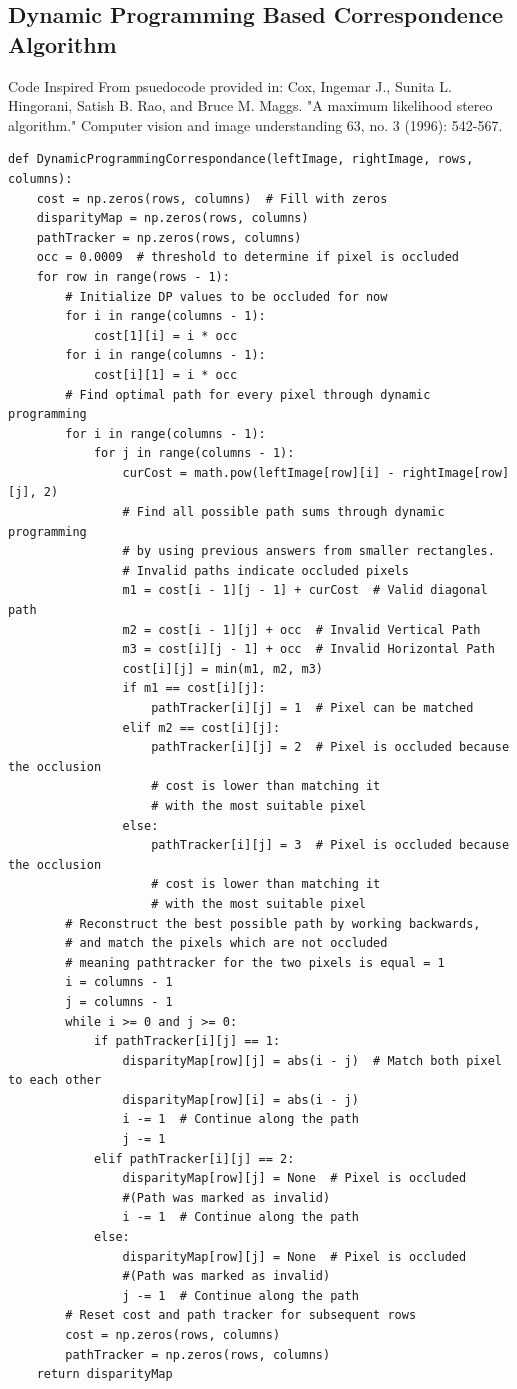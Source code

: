 \documentclass[11pt]{scrartcl}
\begin{document}
\subsection{Dynamic Programming Based Correspondence Algorithm}
Code Inspired From psuedocode provided in: Cox, Ingemar J., Sunita L. Hingorani, Satish B. Rao, and Bruce M. Maggs. 
"A maximum likelihood stereo algorithm." Computer vision and image understanding 63, 
no. 3 (1996): 542-567.
\begin{verbatim}
def DynamicProgrammingCorrespondance(leftImage, rightImage, rows, columns):
    cost = np.zeros(rows, columns)  # Fill with zeros
    disparityMap = np.zeros(rows, columns)
    pathTracker = np.zeros(rows, columns)
    occ = 0.0009  # threshold to determine if pixel is occluded
    for row in range(rows - 1):
        # Initialize DP values to be occluded for now
        for i in range(columns - 1):
            cost[1][i] = i * occ
        for i in range(columns - 1):
            cost[i][1] = i * occ
        # Find optimal path for every pixel through dynamic programming
        for i in range(columns - 1):
            for j in range(columns - 1):
                curCost = math.pow(leftImage[row][i] - rightImage[row][j], 2)
                # Find all possible path sums through dynamic programming
                # by using previous answers from smaller rectangles.
                # Invalid paths indicate occluded pixels
                m1 = cost[i - 1][j - 1] + curCost  # Valid diagonal path
                m2 = cost[i - 1][j] + occ  # Invalid Vertical Path
                m3 = cost[i][j - 1] + occ  # Invalid Horizontal Path
                cost[i][j] = min(m1, m2, m3)
                if m1 == cost[i][j]:
                    pathTracker[i][j] = 1  # Pixel can be matched
                elif m2 == cost[i][j]:
                    pathTracker[i][j] = 2  # Pixel is occluded because the occlusion  
                    # cost is lower than matching it
                    # with the most suitable pixel
                else:
                    pathTracker[i][j] = 3  # Pixel is occluded because the occlusion 
                    # cost is lower than matching it
                    # with the most suitable pixel
        # Reconstruct the best possible path by working backwards,
        # and match the pixels which are not occluded
        # meaning pathtracker for the two pixels is equal = 1
        i = columns - 1
        j = columns - 1
        while i >= 0 and j >= 0:
            if pathTracker[i][j] == 1:
                disparityMap[row][j] = abs(i - j)  # Match both pixel to each other
                disparityMap[row][i] = abs(i - j)
                i -= 1  # Continue along the path
                j -= 1
            elif pathTracker[i][j] == 2:
                disparityMap[row][j] = None  # Pixel is occluded 
                #(Path was marked as invalid)
                i -= 1  # Continue along the path
            else:
                disparityMap[row][j] = None  # Pixel is occluded 
                #(Path was marked as invalid)
                j -= 1  # Continue along the path
        # Reset cost and path tracker for subsequent rows
        cost = np.zeros(rows, columns)
        pathTracker = np.zeros(rows, columns)
    return disparityMap
\end{verbatim}
\end{document}
